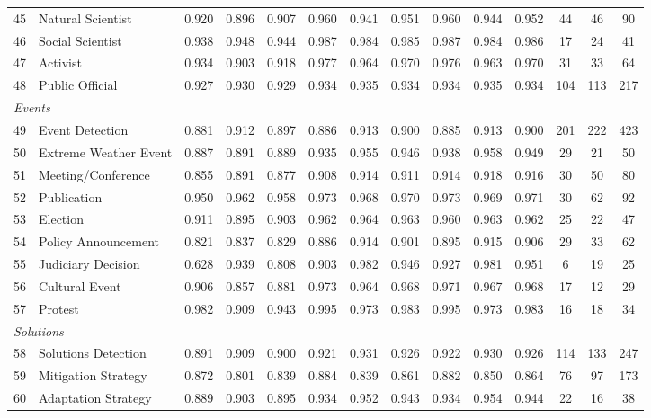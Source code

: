 \documentclass[12pt]{article}
\begin{document}
{\begin{longtable}{p{0.4cm}p{5.5cm}cccccccccccc}
45 & Natural Scientist & 0.920 & 0.896 & 0.907 & 0.960 & 0.941 & 0.951 & 0.960 & 0.944 & 0.952 & 44 & 46 & 90 \\
46 & Social Scientist & 0.938 & 0.948 & 0.944 & 0.987 & 0.984 & 0.985 & 0.987 & 0.984 & 0.986 & 17 & 24 & 41 \\
47 & Activist & 0.934 & 0.903 & 0.918 & 0.977 & 0.964 & 0.970 & 0.976 & 0.963 & 0.970 & 31 & 33 & 64 \\
48 & Public Official & 0.927 & 0.930 & 0.929 & 0.934 & 0.935 & 0.934 & 0.934 & 0.935 & 0.934 & 104 & 113 & 217 \\
\midrule
\multicolumn{14}{l}{\textit{Events}} \\
49 & Event Detection & 0.881 & 0.912 & 0.897 & 0.886 & 0.913 & 0.900 & 0.885 & 0.913 & 0.900 & 201 & 222 & 423 \\
50 & Extreme Weather Event & 0.887 & 0.891 & 0.889 & 0.935 & 0.955 & 0.946 & 0.938 & 0.958 & 0.949 & 29 & 21 & 50 \\
51 & Meeting/Conference & 0.855 & 0.891 & 0.877 & 0.908 & 0.914 & 0.911 & 0.914 & 0.918 & 0.916 & 30 & 50 & 80 \\
52 & Publication & 0.950 & 0.962 & 0.958 & 0.973 & 0.968 & 0.970 & 0.973 & 0.969 & 0.971 & 30 & 62 & 92 \\
53 & Election & 0.911 & 0.895 & 0.903 & 0.962 & 0.964 & 0.963 & 0.960 & 0.963 & 0.962 & 25 & 22 & 47 \\
54 & Policy Announcement & 0.821 & 0.837 & 0.829 & 0.886 & 0.914 & 0.901 & 0.895 & 0.915 & 0.906 & 29 & 33 & 62 \\
55 & Judiciary Decision & 0.628 & 0.939 & 0.808 & 0.903 & 0.982 & 0.946 & 0.927 & 0.981 & 0.951 & 6 & 19 & 25 \\
56 & Cultural Event & 0.906 & 0.857 & 0.881 & 0.973 & 0.964 & 0.968 & 0.971 & 0.967 & 0.968 & 17 & 12 & 29 \\
57 & Protest & 0.982 & 0.909 & 0.943 & 0.995 & 0.973 & 0.983 & 0.995 & 0.973 & 0.983 & 16 & 18 & 34 \\
\midrule  
\multicolumn{14}{l}{\textit{Solutions}} \\
58 & Solutions Detection & 0.891 & 0.909 & 0.900 & 0.921 & 0.931 & 0.926 & 0.922 & 0.930 & 0.926 & 114 & 133 & 247 \\
59 & Mitigation Strategy & 0.872 & 0.801 & 0.839 & 0.884 & 0.839 & 0.861 & 0.882 & 0.850 & 0.864 & 76 & 97 & 173 \\
60 & Adaptation Strategy & 0.889 & 0.903 & 0.895 & 0.934 & 0.952 & 0.943 & 0.934 & 0.954 & 0.944 & 22 & 16 & 38 \\

\end{longtable}}
\end{document}
